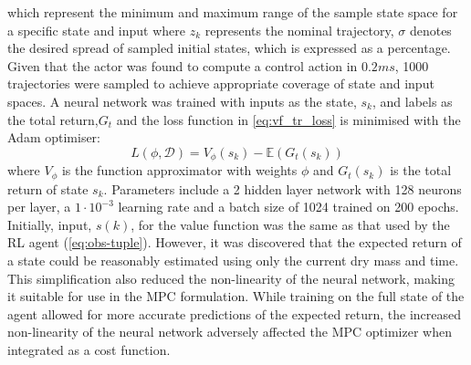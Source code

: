 which represent the minimum and maximum range of the sample state space for a specific state and input where ${z}_{k}$ represents the nominal trajectory, $\sigma$ denotes the desired spread of sampled initial states, which is expressed as a percentage. Given that the actor was found to compute a control action in $0.2 ms$, 1000 trajectories were sampled to achieve appropriate coverage of state and input spaces.
A neural network  was trained with inputs as the state, $s_k$, and labels as the total return,$G_t$ and the loss function in \autoref{eq:vf_tr_loss} is minimised with the Adam optimiser:
\begin{equation}
	\label{eq:vf_tr_loss}
	L(\phi, \mathcal{D}) =   V_{\phi}(s_k) - \mathbb{E}(G_t(s_k))
\end{equation}
where $V_{\phi}$ is the function approximator with weights $\phi$ and $G_t(s_k)$ is the total return of state $s_k$. Parameters include a 2 hidden layer network with 128 neurons per layer, a $1\cdot 10^{-3}$ learning rate and a batch size of 1024 trained on 200 epochs. Initially,  input, $s(k)$, for the value function was the same as that used by the RL agent (\autoref{eq:obs-tuple}). However, it was discovered that the expected return of a state could be reasonably estimated using only the current dry mass and time. This simplification also reduced the non-linearity of the neural network, making it suitable for use in the MPC formulation. While training on the full state of the agent allowed for more accurate predictions of the expected return, the increased non-linearity of the neural network adversely affected the MPC optimizer when integrated as a cost function.


